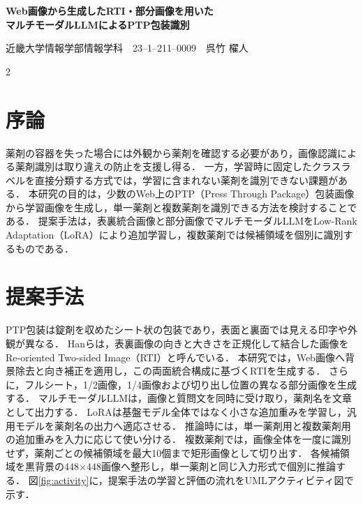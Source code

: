 \documentclass[10pt,a4paper]{article}
\newcommand{\PTP}{PTP包装}
\newcommand{\RTI}{RTI}
\newcommand{\LoRA}{LoRA}
\begin{document}
\pagestyle{empty}

\begin{center}
  {\Large\bfseries\sffamily
    Web画像から生成したRTI・部分画像を用いた\\[-1mm]
    マルチモーダルLLMによるPTP包装識別
  \par}
\end{center}
\vspace{-2.5mm}
\noindent\hfill{\small 近畿大学情報学部情報学科　23--1--211--0009　呉竹 櫂人}\par
\vspace{0.5mm}

\begin{multicols}{2}
\raggedcolumns

\section{序論}

薬剤の容器を失った場合には外観から薬剤を確認する必要があり，画像認識による薬剤識別は取り違えの防止を支援し得る\cite{heo2023pill}．
一方，学習時に固定したクラスラベルを直接分類する方式では，学習に含まれない薬剤を識別できない課題がある\cite{heo2023pill}．
本研究の目的は，少数のWeb上のPTP（Press Through Package）包装画像から学習画像を生成し，単一薬剤と複数薬剤を識別できる方法を検討することである．
提案手法は，表裏統合画像と部分画像でマルチモーダルLLMをLow-Rank Adaptation（LoRA）により追加学習し，複数薬剤では候補領域を個別に識別するものである\cite{han2021blister,hu2022lora}．

\section{提案手法}

\PTP は錠剤を収めたシート状の包装であり，表面と裏面では見える印字や外観が異なる．
Hanらは，表裏画像の向きと大きさを正規化して結合した画像をRe-oriented Two-sided Image（RTI）と呼んでいる\cite{han2021blister}．
本研究では，Web画像へ背景除去と向き補正を適用し，この両面統合構成に基づく\RTI を生成する．
さらに，フルシート，1/2画像，1/4画像および切り出し位置の異なる部分画像を生成する．
マルチモーダルLLMは，画像と質問文を同時に受け取り，薬剤名を文章として出力する．
\LoRA は基盤モデル全体ではなく小さな追加重みを学習し，汎用モデルを薬剤名の出力へ適応させる．
推論時には，単一薬剤用と複数薬剤用の追加重みを入力に応じて使い分ける．
複数薬剤では，画像全体を一度に識別せず，薬剤ごとの候補領域を最大10個まで矩形画像として切り出す．
各候補領域を黒背景の448×448画像へ整形し，単一薬剤と同じ入力形式で個別に推論する．
図\ref{fig:activity}に，提案手法の学習と評価の流れをUMLアクティビティ図で示す．


\end{multicols}
\end{document}
